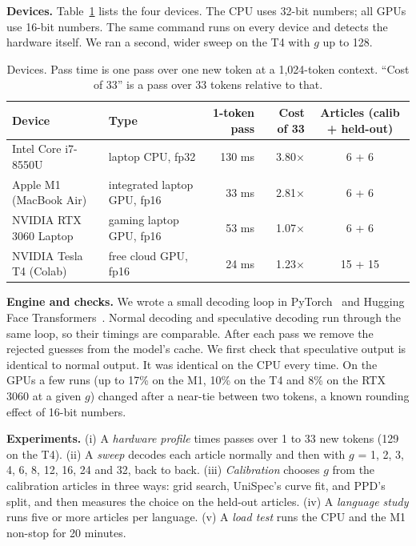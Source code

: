 \documentclass{article}
\newcommand{\tms}{\ensuremath{\times}}
\begin{document}
\textbf{Devices.}
Table~\ref{tab:devices} lists the four devices.
The CPU uses 32-bit numbers; all GPUs use 16-bit numbers.
The same command runs on every device and detects the hardware itself.
We ran a second, wider sweep on the T4 with $g$ up to 128.

\begin{table}[t]
\centering
\small
\caption{Devices. Pass time is one pass over one new token at a 1,024-token context. ``Cost of 33'' is a pass over 33 tokens relative to that.}
\label{tab:devices}
\begin{tabular}{llrrc}
\toprule
Device & Type & 1-token pass & Cost of 33 & Articles (calib + held-out) \\
\midrule
Intel Core i7-8550U & laptop CPU, fp32 & 130 ms & 3.80\tms & 6 + 6 \\
Apple M1 (MacBook Air) & integrated laptop GPU, fp16 & 33 ms & 2.81\tms & 6 + 6 \\
NVIDIA RTX 3060 Laptop & gaming laptop GPU, fp16 & 53 ms & 1.07\tms & 6 + 6 \\
NVIDIA Tesla T4 (Colab) & free cloud GPU, fp16 & 24 ms & 1.23\tms & 15 + 15 \\
\bottomrule
\end{tabular}
\end{table}

\textbf{Engine and checks.}
We wrote a small decoding loop in PyTorch~\citep{pytorch} and Hugging Face Transformers~\citep{transformers}.
Normal decoding and speculative decoding run through the same loop, so their timings are comparable.
After each pass we remove the rejected guesses from the model's cache.
We first check that speculative output is identical to normal output.
It was identical on the CPU every time.
On the GPUs a few runs (up to 17\% on the M1, 10\% on the T4 and 8\% on the RTX 3060 at a given $g$) changed after a near-tie between two tokens, a known rounding effect of 16-bit numbers.

\textbf{Experiments.}
(i) A \emph{hardware profile} times passes over 1 to 33 new tokens (129 on the T4).
(ii) A \emph{sweep} decodes each article normally and then with $g$ = 1, 2, 3, 4, 6, 8, 12, 16, 24 and 32, back to back.
(iii) \emph{Calibration} chooses $g$ from the calibration articles in three ways: grid search, UniSpec's curve fit, and PPD's split, and then measures the choice on the held-out articles.
(iv) A \emph{language study} runs five or more articles per language.
(v) A \emph{load test} runs the CPU and the M1 non-stop for 20 minutes.
\end{document}
